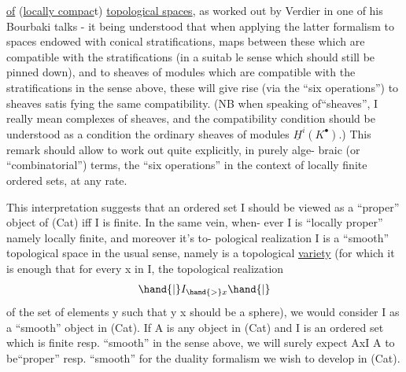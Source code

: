 
\uline{of} (\uline{locally compac}t) \uline{topological spaces}, as worked out by Verdier in one
of his Bourbaki talks - it being understood that when applying the
latter formalism to spaces endowed with conical stratifications, maps
between these which are compatible with the stratifications (in a suitab%
le sense which should still be pinned down), and to sheaves of modules
which  are compatible with the stratifications in the sense
above, these will give rise (via the ``six operations'') to sheaves satis%
\hand{-}fying the same compatibility. (NB when speaking of``sheaves'', I really
mean complexes of sheaves,  and the compatibility condition should be
understood as a condition   the ordinary sheaves of modules $\underline{H}^i(K^\bullet)$.)
This remark should allow to work out quite explicitly, in purely alge-%
braic (or ``combinatorial'') terms, the ``six operations'' in the context
of locally finite ordered sets, at any rate.

This interpretation suggests that an ordered set I should be viewed
as a ``proper'' object of (Cat) iff I is finite. In the same vein, when-%
ever I is ``locally proper'' namely locally finite, and moreover it's to-%
pological realization I is a ``smooth'' topological space in the usual
sense, namely is a topological \uline{variety} (for which it is enough that
for every x in I, the topological realization
\[ \hand{|}I_{\hand{>}x}\hand{|} \]
of the set of elements y such that y \hand{$>$} x should be a sphere), we would
consider I as a ``smooth'' object in (Cat). If A is any object in (Cat)
and I is an ordered set which is finite resp. ``smooth'' in the sense
above, we will surely expect AxI \hand{$\longrightarrow$} A to be``proper'' resp. ``smooth''
for the duality formalism we wish to develop in (Cat).


